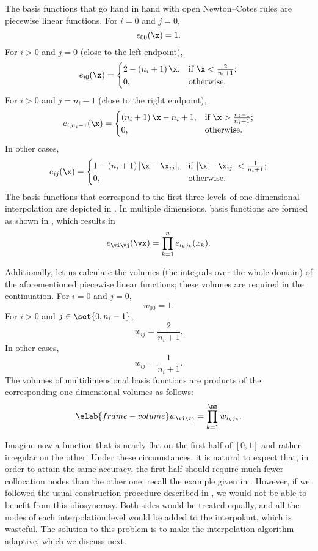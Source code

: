 The basis functions that go hand in hand with open Newton--Cotes rules are
piecewise linear functions. For $i = 0$ and $j = 0$,
\[
  e_{00}(\x) = 1.
\]
For $i > 0$ and $j = 0$ (close to the left endpoint),
\[
  e_{i0}(\x) =
  \begin{cases}
    2 - \left(n_i + 1\right) \x, & \text{if } \x < \frac{2}{n_i + 1}; \\
    0, & \text{otherwise}.
  \end{cases}
\]
For $i > 0$ and $j = n_i - 1$ (close to the right endpoint),
\[
  e_{i, n_i - 1}(\x) =
  \begin{cases}
    \left(n_i + 1\right) \x - n_i + 1, & \text{if } \x > \frac{n_i - 1}{n_i + 1}; \\
    0, & \text{otherwise}.
  \end{cases}
\]
In other cases,
\[
  e_{ij}(\x) =
  \begin{cases}
    1 - \left(n_i + 1\right)|\x - \x_{ij}|, & \text{if } |\x - \x_{ij}| < \frac{1}{n_i + 1}; \\
    0, & \text{otherwise}.
  \end{cases}
\]
The basis functions that correspond to the first three levels of one-dimensional
interpolation are depicted in . In multiple dimensions, basis
functions are formed as shown in , which results in
\[
  e_{\vi \vj}(\vx) = \prod_{k = 1}^n e_{i_k j_k}(x_k).
\]

Additionally, let us calculate the volumes (the integrals over the whole domain)
of the aforementioned piecewise linear functions; these volumes are required in
the continuation. For $i = 0$ and $j = 0$,
\[
  w_{00} = 1.
\]
For $i > 0$ and $j \in \set{0, n_i - 1}$,
\[
  w_{ij} = \frac{2}{n_i + 1}.
\]
In other cases,
\[
  w_{ij} = \frac{1}{n_i + 1}.
\]
The volumes of multidimensional basis functions are products of the
corresponding one-dimensional volumes as follows:
\begin{equation} \elab{frame-volume}
  w_{\vi \vj} = \prod_{k = 1}^\nz w_{i_k j_k}.
\end{equation}

Imagine now a function that is nearly flat on the first half of $[0, 1]$ and
rather irregular on the other. Under these circumstances, it is natural to
expect that, in order to attain the same accuracy, the first half should require
much fewer collocation nodes than the other one; recall the example given in
. However, if we followed the usual construction
procedure described in , we would not be able
to benefit from this idiosyncrasy. Both sides would be treated equally, and all
the nodes of each interpolation level would be added to the interpolant, which
is wasteful. The solution to this problem is to make the interpolation algorithm
adaptive, which we discuss next.

